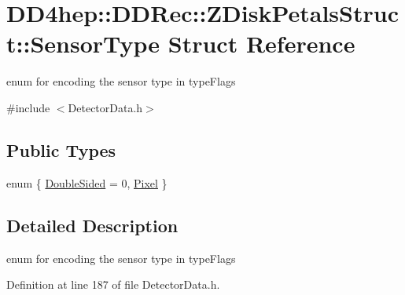 \hypertarget{struct_d_d4hep_1_1_d_d_rec_1_1_z_disk_petals_struct_1_1_sensor_type}{
\section{DD4hep::DDRec::ZDiskPetalsStruct::SensorType Struct Reference}
\label{struct_d_d4hep_1_1_d_d_rec_1_1_z_disk_petals_struct_1_1_sensor_type}
}


enum for encoding the sensor type in typeFlags  


{\ttfamily \#include $<$DetectorData.h$>$}\subsection*{Public Types}
\begin{DoxyCompactItemize}
\item 
enum \{ \hyperlink{struct_d_d4hep_1_1_d_d_rec_1_1_z_disk_petals_struct_1_1_sensor_type_a7adf005f92ce26633f914a97d759d32dad987a4969ad80712a640e43136b96578}{DoubleSided} = 0, 
\hyperlink{struct_d_d4hep_1_1_d_d_rec_1_1_z_disk_petals_struct_1_1_sensor_type_a7adf005f92ce26633f914a97d759d32da73fc4b655f1930a5283de453c1dc406f}{Pixel}
 \}
\end{DoxyCompactItemize}


\subsection{Detailed Description}
enum for encoding the sensor type in typeFlags 

Definition at line 187 of file DetectorData.h.

